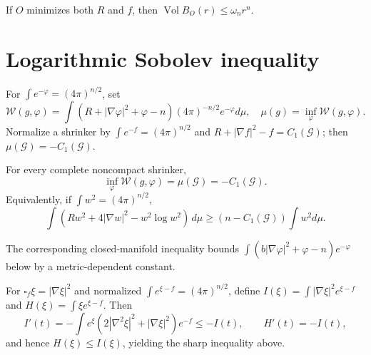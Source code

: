 \begin{remark}
\label{rem:chow-iv-volume-at-scalar-minimum}
If $O$ minimizes both $R$ and $f$, then $\operatorname{Vol}B_O(r)\le\omega_nr^n$.
\end{remark}

\section{Logarithmic Sobolev inequality}

\begin{definition}
\label{def:chow-iv-shrinker-entropy}
For $\int e^{-\varphi}=(4\pi)^{n/2}$, set
\[
\mathcal W(g,\varphi)=\int(R+|\nabla\varphi|^2+\varphi-n)(4\pi)^{-n/2}e^{-\varphi}d\mu,
\quad \mu(g)=\inf_\varphi\mathcal W(g,\varphi).
\]
Normalize a shrinker by $\int e^{-f}=(4\pi)^{n/2}$ and
$R+|\nabla f|^2-f=C_1(\mathcal G)$; then $\mu(\mathcal G)=-C_1(\mathcal G)$.
\end{definition}

\begin{theorem}
\label{thm:chow-iv-sharp-log-sobolev}
For every complete noncompact shrinker,
\[
\inf_\varphi\mathcal W(g,\varphi)=\mu(\mathcal G)=-C_1(\mathcal G).
\]
Equivalently, if $\int w^2=(4\pi)^{n/2}$,
\[
\int(Rw^2+4|\nabla w|^2-w^2\log w^2)\,d\mu
\ge(n-C_1(\mathcal G))\int w^2d\mu.
\]
\end{theorem}

\begin{remark}
\label{rem:chow-iv-log-sobolev-closed}
The corresponding closed-manifold inequality bounds
$\int(b|\nabla\varphi|^2+\varphi-n)e^{-\varphi}$ below by a metric-dependent constant.
\end{remark}

\begin{lemma}
\label{lem:chow-iv-fisher-entropy-dissipation}
For $\square_f\xi=|\nabla\xi|^2$ and normalized
$\int e^{\xi-f}=(4\pi)^{n/2}$, define
$I(\xi)=\int|\nabla\xi|^2e^{\xi-f}$ and
$H(\xi)=\int\xi e^{\xi-f}$.  Then
\[
I'(t)=-\int e^{\xi}(2|\nabla^2\xi|^2+|\nabla\xi|^2)e^{-f}\le-I(t),
\qquad H'(t)=-I(t),
\]
and hence $H(\xi)\le I(\xi)$, yielding the sharp inequality above.
\end{lemma}

